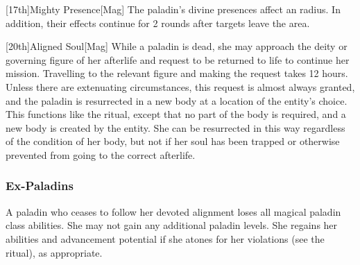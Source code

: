        [17th]{Mighty Presence}[Mag]
        The paladin's divine presences affect an \areahuge radius.
        In addition, their effects continue for 2 rounds after targets leave the area.

        [20th]{Aligned Soul}[Mag]
        While a paladin is dead, she may approach the deity or governing figure of her afterlife and request to be returned to life to continue her mission.
        Travelling to the relevant figure and making the request takes 12 hours.
        Unless there are extenuating circumstances, this request is almost always granted, and the paladin is resurrected in a new body at a location of the entity's choice.
        This functions like the  ritual, except that no part of the body is required, and a new body is created by the entity.
        She can be resurrected in this way regardless of the condition of her body, but not if her soul has been trapped or otherwise prevented from going to the correct afterlife.

        \subsubsection{Ex-Paladins}
            A paladin who ceases to follow her devoted alignment loses all magical paladin class abilities.
            She may not gain any additional paladin levels.
            She regains her abilities and advancement potential if she atones for her violations (see the  ritual), as appropriate.


